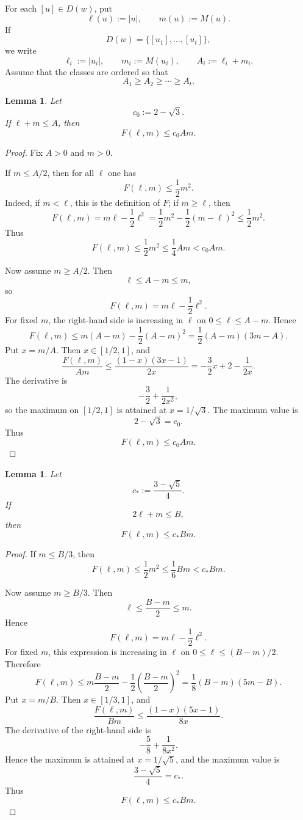 \documentclass[runningheads,envcountsame,a4paper]{llncs}
\newtheorem{lem}[thm]{Lemma}
\begin{document}
For each \([u]\in D(w)\), put
\[
        \ell(u):=|u|,\qquad m(u):=M(u).
\]
If
\[
        D(w)=\{[u_1],\ldots,[u_t]\},
\]
we write
\[
        \ell_i:=|u_i|,\qquad m_i:=M(u_i),\qquad A_i:=\ell_i+m_i .
\]
Assume that the classes are ordered so that
\[
        A_1\ge A_2\ge\cdots\ge A_t .
\]

\begin{lem}\label{lem:A-optimization}
Let
\[
        c_0:=2-\sqrt3.
\]
If \(\ell+m\le A\), then
\[
        F(\ell,m)\le c_0Am.
\]
\end{lem}

\begin{proof}
Fix \(A>0\) and \(m>0\).

If \(m\le A/2\), then for all \(\ell\) one has
\[
        F(\ell,m)\le \frac12m^2.
\]
Indeed, if \(m<\ell\), this is the definition of \(F\); if \(m\ge\ell\), then
\[
        F(\ell,m)=m\ell-\frac12\ell^2
        =
        \frac12m^2-\frac12(m-\ell)^2
        \le
        \frac12m^2.
\]
Thus
\[
        F(\ell,m)\le \frac12m^2\le \frac14Am<c_0Am.
\]

Now assume \(m\ge A/2\). Then
\[
        \ell\le A-m\le m,
\]
so
\[
        F(\ell,m)=m\ell-\frac12\ell^2.
\]
For fixed \(m\), the right-hand side is increasing in \(\ell\) on
\(0\le \ell\le A-m\). Hence
\[
        F(\ell,m)
        \le
        m(A-m)-\frac12(A-m)^2
        =
        \frac12(A-m)(3m-A).
\]
Put \(x=m/A\). Then \(x\in[1/2,1]\), and
\[
        \frac{F(\ell,m)}{Am}
        \le
        \frac{(1-x)(3x-1)}{2x}
        =
        -\frac32x+2-\frac1{2x}.
\]
The derivative is
\[
        -\frac32+\frac1{2x^2},
\]
so the maximum on \([1/2,1]\) is attained at \(x=1/\sqrt3\). The maximum value is
\[
        2-\sqrt3=c_0.
\]
Thus
\[
        F(\ell,m)\le c_0Am.
\]
\end{proof}

\begin{lem}\label{lem:B-optimization}
Let
\[
        c_*:=\frac{3-\sqrt5}{4}.
\]
If
\[
        2\ell+m\le B,
\]
then
\[
        F(\ell,m)\le c_*Bm.
\]
\end{lem}

\begin{proof}
If \(m\le B/3\), then
\[
        F(\ell,m)\le \frac12m^2\le \frac16Bm<c_*Bm.
\]

Now assume \(m\ge B/3\). Then
\[
        \ell\le \frac{B-m}{2}\le m.
\]
Hence
\[
        F(\ell,m)=m\ell-\frac12\ell^2.
\]
For fixed \(m\), this expression is increasing in \(\ell\) on
\(0\le\ell\le (B-m)/2\). Therefore
\[
        F(\ell,m)
        \le
        m\frac{B-m}{2}
        -
        \frac12\left(\frac{B-m}{2}\right)^2
        =
        \frac18(B-m)(5m-B).
\]
Put \(x=m/B\). Then \(x\in[1/3,1]\), and
\[
        \frac{F(\ell,m)}{Bm}
        \le
        \frac{(1-x)(5x-1)}{8x}.
\]
The derivative of the right-hand side is
\[
        -\frac58+\frac1{8x^2}.
\]
Hence the maximum is attained at \(x=1/\sqrt5\), and the maximum value is
\[
        \frac{3-\sqrt5}{4}=c_*.
\]
Thus
\[
        F(\ell,m)\le c_*Bm.
\]
\end{proof}
\end{document}
